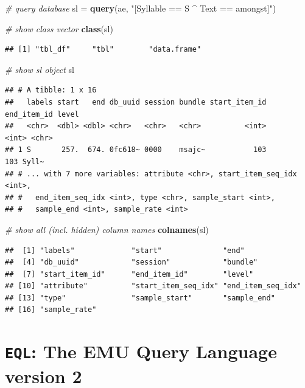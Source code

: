 \documentclass[]{book}
\newenvironment{Shaded}{\begin{snugshade}}{\end{snugshade}}
\newcommand{\CommentTok}[1]{\textcolor[rgb]{0.56,0.35,0.01}{\textit{#1}}}
\newcommand{\KeywordTok}[1]{\textcolor[rgb]{0.13,0.29,0.53}{\textbf{#1}}}
\newcommand{\NormalTok}[1]{#1}
\newcommand{\StringTok}[1]{\textcolor[rgb]{0.31,0.60,0.02}{#1}}
\begin{document}
\begin{Shaded}
\begin{Highlighting}[]
\CommentTok{# query database}
\NormalTok{sl =}\StringTok{ }\KeywordTok{query}\NormalTok{(ae, }\StringTok{"[Syllable == S ^ Text == amongst]"}\NormalTok{)}

\CommentTok{# show class vector}
\KeywordTok{class}\NormalTok{(sl)}
\end{Highlighting}
\end{Shaded}

\begin{verbatim}
## [1] "tbl_df"     "tbl"        "data.frame"
\end{verbatim}

\begin{Shaded}
\begin{Highlighting}[]
\CommentTok{# show sl object}
\NormalTok{sl}
\end{Highlighting}
\end{Shaded}

\begin{verbatim}
## # A tibble: 1 x 16
##   labels start   end db_uuid session bundle start_item_id end_item_id level
##   <chr>  <dbl> <dbl> <chr>   <chr>   <chr>          <int>       <int> <chr>
## 1 S       257.  674. 0fc618~ 0000    msajc~           103         103 Syll~
## # ... with 7 more variables: attribute <chr>, start_item_seq_idx <int>,
## #   end_item_seq_idx <int>, type <chr>, sample_start <int>,
## #   sample_end <int>, sample_rate <int>
\end{verbatim}

\begin{Shaded}
\begin{Highlighting}[]
\CommentTok{# show all (incl. hidden) column names}
\KeywordTok{colnames}\NormalTok{(sl)}
\end{Highlighting}
\end{Shaded}

\begin{verbatim}
##  [1] "labels"             "start"              "end"               
##  [4] "db_uuid"            "session"            "bundle"            
##  [7] "start_item_id"      "end_item_id"        "level"             
## [10] "attribute"          "start_item_seq_idx" "end_item_seq_idx"  
## [13] "type"               "sample_start"       "sample_end"        
## [16] "sample_rate"
\end{verbatim}

\hypertarget{eql-the-emu-query-language-version-2}{%
\section{\texorpdfstring{\texttt{EQL}: The EMU Query Language version 2}{EQL: The EMU Query Language version 2}}\label{eql-the-emu-query-language-version-2}}
\end{document}
